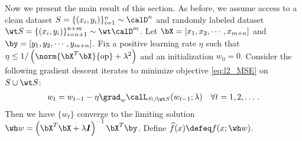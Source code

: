 Now we present the main result of this section. 
As before, we assume access to a clean dataset 
$S = \{(x_i, y_i)\}_{i=1}^n \sim \calD^n$ 
and randomly labeled dataset 
$\wt S = \{(x_i, y_i)\}_{i=n+1}^{n+m} \sim \wt \calD^m$. 
Let $\bX = [x_1, x_2, \cdots, x_{m+n}]$ 
and $\by = [y_1, y_2, \cdots, y_{m+n}]$. 
Fix a positive learning rate $\eta$ such that 
$\eta \le 1/\left(\norm{\bX^T\bX}{\text{op}} + \lambda^2\right)$ 
and an initialization $w_0 = 0$. 
Consider the following gradient descent iterates 
to minimize objective \eqref{eq:l2_MSE} on $S \cup \wt S$:
\begin{align}
w_t = w_{t-1} - \eta \grad_w \calL_{S \cup \wt S} (w_{t-1}; \lambda) \quad \forall t=1,2,\ldots \,. \label{eq:GD_iterates}
\end{align} 
Then we have $\{ w_t\}$ converge to the limiting solution 
$\wh w = \left( \bX^T\bX+\lambda \boldsymbol{I}\right)^{-1}\bX^T\by$. Define $\widehat f (x) \defeq f(x ; \wh w) $.  

